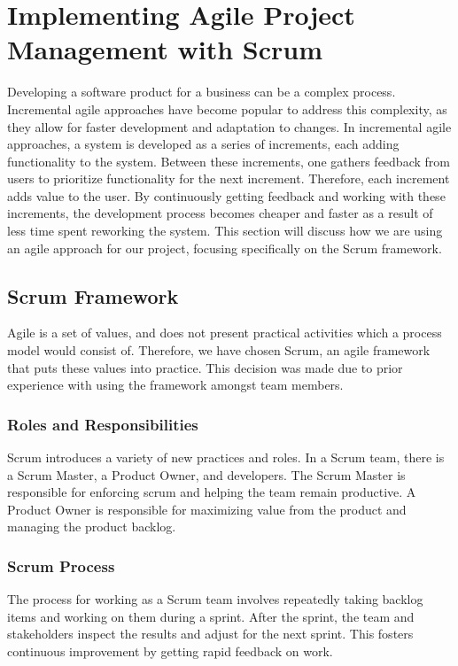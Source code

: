 \section{Implementing Agile Project Management with Scrum}
Developing a software product for a business can be a complex process.
Incremental agile approaches have become popular to address this complexity, as they allow for faster development and adaptation to changes.\cite{sommervilleSoftwareEngineering2016}
In incremental agile approaches, a system is developed as a series of increments, each adding functionality to the system. 	
Between these increments, one gathers feedback from users to prioritize functionality for the next increment.
Therefore, each increment adds value to the user.
By continuously getting feedback and working with these increments, the development process becomes cheaper and faster as a result of less time spent reworking the system.\cite{sommervilleSoftwareEngineering2016}
This section will discuss how we are using an agile approach for our project, focusing specifically on the Scrum framework.

\subsection*{Scrum Framework}
Agile is a set of values, and does not present practical activities which a process model would consist of\cite{sutherlandScrumArtDoing2014}.
Therefore, we have chosen Scrum\cite{scrumdotorg}, an agile framework that puts these values into practice.
This decision was made due to prior experience with using the framework amongst team members.

\subsubsection*{Roles and Responsibilities}
Scrum introduces a variety of new practices and roles.
In a Scrum team, there is a Scrum Master, a Product Owner, and developers.
The Scrum Master is responsible for enforcing scrum and helping the team remain productive.
A Product Owner is responsible for maximizing value from the product and managing the product backlog.

\subsubsection*{Scrum Process}
The process for working as a Scrum team involves repeatedly taking backlog items and working on them during a sprint.
After the sprint, the team and stakeholders inspect the results and adjust for the next sprint.
This fosters continuous improvement by getting rapid feedback on work.

